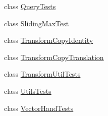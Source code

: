 \begin{DoxyCompactItemize}
\item 
class \mbox{\hyperlink{class_leap_1_1_unity_1_1_tests_1_1_query_tests}{Query\+Tests}}
\item 
class \mbox{\hyperlink{class_leap_1_1_unity_1_1_tests_1_1_sliding_max_test}{Sliding\+Max\+Test}}
\item 
class \mbox{\hyperlink{class_leap_1_1_unity_1_1_tests_1_1_transform_copy_identity}{Transform\+Copy\+Identity}}
\item 
class \mbox{\hyperlink{class_leap_1_1_unity_1_1_tests_1_1_transform_copy_translation}{Transform\+Copy\+Translation}}
\item 
class \mbox{\hyperlink{class_leap_1_1_unity_1_1_tests_1_1_transform_util_tests}{Transform\+Util\+Tests}}
\item 
class \mbox{\hyperlink{class_leap_1_1_unity_1_1_tests_1_1_utils_tests}{Utils\+Tests}}
\item 
class \mbox{\hyperlink{class_leap_1_1_unity_1_1_tests_1_1_vector_hand_tests}{Vector\+Hand\+Tests}}
\end{DoxyCompactItemize}
